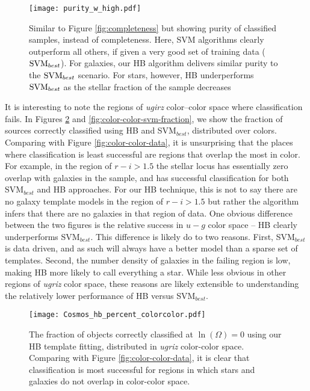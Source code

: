 \documentclass[12pt,preprint]{aastex}
\begin{document}
\begin{figure}
\centering
\texttt{[image: purity\_w\_high.pdf]}
\caption{Similar to Figure \ref{fig:completeness} but showing purity of classified samples, instead 
of completeness. Here, SVM algorithms clearly outperform all others, if given a very good set 
of training data (${\rm SVM}_{best}$).  For galaxies, our HB algorithm delivers similar purity to the ${\rm SVM}_{best}$ 
scenario.  For stars, however, HB underperforms ${\rm SVM}_{best}$ as the stellar fraction of the 
sample decreases}
\label{fig:purity}
\end{figure}

It is interesting to note the regions of {\it ugirz} color--color space where classification fails.  In 
Figures \ref{fig:color-color-hb-fraction} and  \ref{fig:color-color-svm-fraction}, we show the fraction 
of sources correctly classified using HB and SVM$_{best}$, distributed over colors.  Comparing with 
Figure \ref{fig:color-color-data}, it is unsurprising that the places where classification is least 
successful are regions that overlap the most in color.  For example, in the region of $r-i>1.5$ the 
stellar locus has essentially zero overlap with galaxies in the sample, and has successful classification 
for both SVM$_{best}$ and HB approaches.  For our HB technique, this is not to say there are no galaxy 
template models in the region of $r-i>1.5$ but rather the algorithm infers that there are no galaxies in that 
region of data.  One obvious difference between the two figures is the relative success in $u-g$ color 
space -- HB clearly underperforms SVM$_{best}$.  This difference is likely do to two reasons.  First, 
SVM$_{best}$ is data driven, and as such will always have a better model than a sparse set of templates.  
Second, the number density of galaxies in the failing region is low, making HB more likely to call 
everything a star.  While less obvious in other regions of {\it ugriz} color space, these reasons are likely 
extensible to understanding the relatively lower performance of HB versus SVM$_{best}$.

\begin{figure}
\centering
\texttt{[image: Cosmos\_hb\_percent\_colorcolor.pdf]}
\caption{The fraction of objects correctly classified at $\ln(\Omega)=0$ using our HB template fitting, distributed in {\it ugriz} 
color-color space.  Comparing with Figure \ref{fig:color-color-data}, it is clear that classification is most 
successful for regions in which stars and galaxies do not overlap in color-color space.}
\label{fig:color-color-hb-fraction}
\end{figure}
\end{document}
